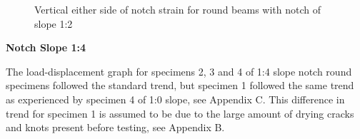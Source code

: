 \documentclass[11pt,a4paper]{article}
\numberwithin{equation}{subsection}
\begin{document}
\begin{figure}[h]
	\begin{center}
	\end{center}
	\caption{Vertical either side of notch strain for round beams with notch of slope 1:2}
	\label{fig:Round_12_ZY}
\end{figure}
\pagebreak

\noindent
\textbf{Notch Slope 1:4}\par
\noindent
The load-displacement graph for specimens 2, 3 and 4 of 1:4 slope notch round specimens followed the standard trend, but specimen 1 followed the same trend as experienced by specimen 4 of 1:0 slope, see Appendix C. This difference in trend for specimen 1 is assumed to be due to the large amount of drying cracks and knots present before testing, see Appendix B.
\end{document}

